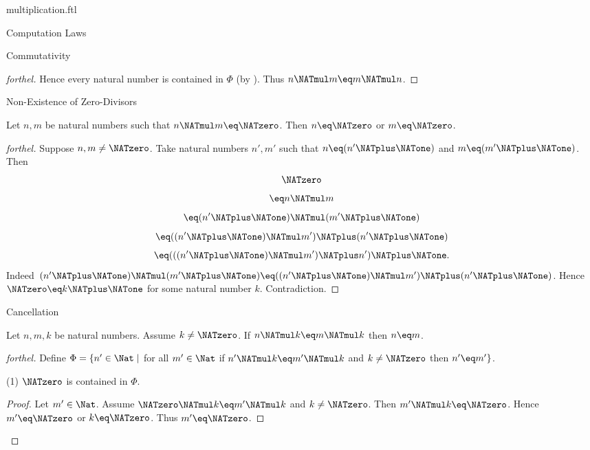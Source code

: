 \documentclass{naproche-library}
\begin{document}
\begin{smodule}[title=Multiplication]{multiplication.ftl}
\begin{sfragment}{Computation Laws}
\begin{sfragment}{Commutativity}
\begin{proof}[forthel]
      Hence every natural number is contained in $\Phi$ (by ).
      Thus $n \NATmul m \eq m \NATmul n$.
    \end{proof}
  \end{sfragment}

  \begin{sfragment}{Non-Existence of Zero-Divisors}
    \begin{proposition}[forthel,id=ARITHMETIC_06_3843962875936768]
      Let $n, m$ be natural numbers such that $n \NATmul m \eq \NATzero$.
      Then $n \eq \NATzero$ or $m \eq \NATzero$.
    \end{proposition}
    \begin{proof}[forthel]
      Suppose $n, m \neq \NATzero$.
      Take natural numbers $n', m'$ such that $n \eq (n' \NATplus \NATone)$ and $m \eq (m' \NATplus \NATone)$.
      Then
      \[  \NATzero                                     \]
      \[    \eq n \NATmul m                         \]
      \[    \eq (n' \NATplus \NATone) \NATmul (m' \NATplus \NATone)           \]
      \[    \eq ((n' \NATplus \NATone) \NATmul m') \NATplus (n' \NATplus \NATone)    \]
      \[    \eq (((n' \NATplus \NATone) \NATmul m') \NATplus n') \NATplus \NATone.   \]
      Indeed $(n' \NATplus \NATone) \NATmul (m' \NATplus \NATone) \eq ((n' \NATplus \NATone) \NATmul m') \NATplus (n' \NATplus \NATone)$.
      Hence $\NATzero \eq k \NATplus \NATone$ for some natural number $k$.
      Contradiction.
    \end{proof}
  \end{sfragment}

  \begin{sfragment}{Cancellation}
    \begin{proposition}[forthel,id=ARITHMETIC_06_31055184658432]
      Let $n, m, k$ be natural numbers.
      Assume $k \neq \NATzero$.
      If $n \NATmul k \eq m \NATmul k$ then $n \eq m$.
    \end{proposition}
    \begin{proof}[forthel]
      Define $\Phi = \{ n' \in \Nat \mid$ for all $m' \in \Nat$ if $n' \NATmul k \eq m' \NATmul k$ and $k \neq \NATzero$ then $n' \eq m' \}$.

      (1) $\NATzero$ is contained in $\Phi$.
      \begin{proof}
        Let $m' \in \Nat$.
        Assume $\NATzero \NATmul k \eq m' \NATmul k$ and $k \neq \NATzero$.
        Then $m' \NATmul k \eq \NATzero$.
        Hence $m' \eq \NATzero$ or $k \eq \NATzero$.
        Thus $m' \eq \NATzero$.
      \end{proof}


\end{proof}
\end{sfragment}
\end{sfragment}
\end{smodule}
\end{document}
